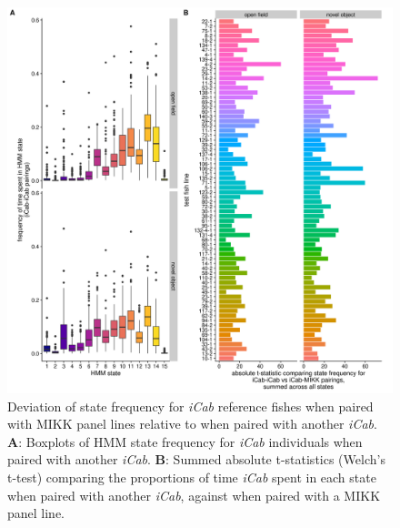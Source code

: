 \documentclass[
]{book}
\begin{document}
\begin{figure}
\includegraphics[width=1\linewidth]{figs/mikk_behaviour/0.08_15_deviation} \caption{Deviation of state frequency for \emph{\textcolor{iCab_424B4D}{iCab}} reference fishes when paired with MIKK panel lines relative to when paired with another \emph{\textcolor{iCab_424B4D}{iCab}}. \textbf{A}: Boxplots of HMM state frequency for \emph{\textcolor{iCab_424B4D}{iCab}} individuals when paired with another \emph{\textcolor{iCab_424B4D}{iCab}}. \textbf{B}: Summed absolute t-statistics (Welch's t-test) comparing the proportions of time \emph{\textcolor{iCab_424B4D}{iCab}} spent in each state when paired with another \emph{\textcolor{iCab_424B4D}{iCab}}, against when paired with a MIKK panel line.}\label{fig:F0-sge-deviation}
\end{figure}
\end{document}
